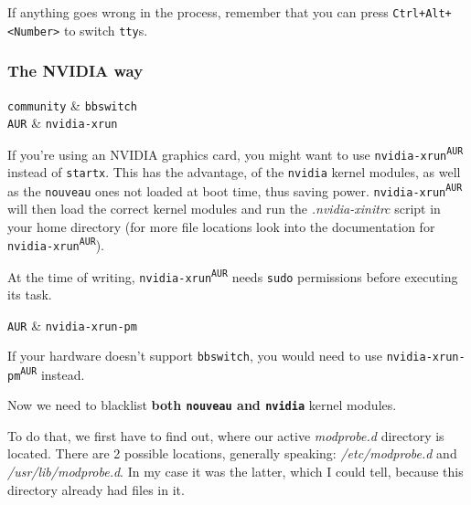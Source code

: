 \documentclass[10pt]{dustdoc}
\begin{document}
If anything goes wrong in the process, remember that you can press \texttt{Ctrl+\allowbreak{}Alt+\allowbreak{}<Number>} to switch \texttt{tty}s.

\subsubsection{The NVIDIA way}
\label{sec:the-nvidia-way}

\begin{packagetable}
    \texttt{community} & \texttt{bbswitch} \\
    \texttt{AUR} & \texttt{nvidia-xrun} \\
\end{packagetable}

If you’re using an NVIDIA graphics card, you might want to use \texttt{nvidia-xrun\textsuperscript{\texttt{AUR}}} instead of \texttt{startx}.
This has the advantage, of the \texttt{nvidia} kernel modules, as well as the \texttt{nouveau} ones not loaded at boot time, thus saving power.
\texttt{nvidia-xrun\textsuperscript{\texttt{AUR}}} will then load the correct kernel modules and run the \textit{.nvidia-xinitrc} script in your home directory (for more file locations look into the documentation for \texttt{nvidia-xrun\textsuperscript{\texttt{AUR}}}).

\begin{IMPORTANT}
    At the time of writing, \texttt{nvidia-xrun\textsuperscript{\texttt{AUR}}} needs \texttt{sudo} permissions before executing its task.
\end{IMPORTANT}

\begin{NOTE}
    \begin{packagetable}
        \texttt{AUR} & \texttt{nvidia-xrun-pm} \\
    \end{packagetable}

    If your hardware doesn’t support \texttt{bbswitch}, you would need to use \texttt{nvidia-xrun-pm\textsuperscript{\texttt{AUR}}} instead.
\end{NOTE}

Now we need to blacklist \textbf{both \texttt{nouveau} and \texttt{nvidia}} kernel modules.

To do that, we first have to find out, where our active \textit{modprobe.d} directory is located.
There are 2 possible locations, generally speaking: \textit{/etc/modprobe.d} and \textit{/usr/lib/modprobe.d}.
In my case it was the latter, which I could tell, because this directory already had files in it.
\end{document}
